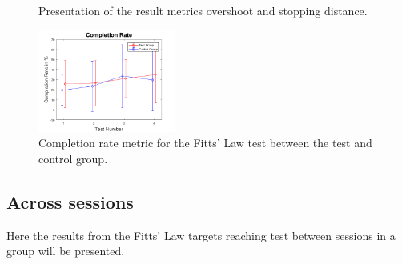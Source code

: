 \begin{figure}[H] 
	\centering
	\caption{Presentation of the result metrics overshoot and stopping distance.}
	\label{fig:resultsOS_SD}
\end{figure}

\begin{figure}[H] 
	\includegraphics[width=0.4\textwidth]{figures/xWesulds/CompletionRate}
	\caption{Completion rate metric for the Fitts' Law test between the test and control group.}
	\label{fig:CRresult}
\end{figure} 


\subsection{Across sessions}
Here the results from the Fitts' Law targets reaching test between sessions in a group will be presented.













